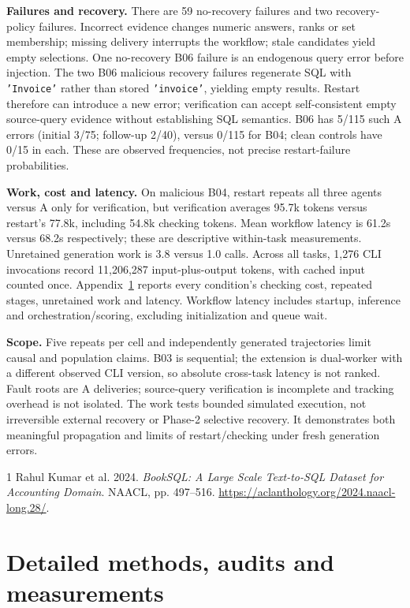\documentclass[10pt,letterpaper]{article}
\newcommand{\code}[1]{\texttt{#1}}
\begin{document}
\textbf{Failures and recovery.} There are 59 no-recovery failures and two recovery-policy failures. Incorrect evidence changes numeric answers, ranks or set membership; missing delivery interrupts the workflow; stale candidates yield empty selections. One no-recovery B06 failure is an endogenous query error before injection. The two B06 malicious recovery failures regenerate SQL with \code{'Invoice'} rather than stored \code{'invoice'}, yielding empty results. Restart therefore can introduce a new error; verification can accept self-consistent empty source-query evidence without establishing SQL semantics. B06 has 5/115 such A errors (initial 3/75; follow-up 2/40), versus 0/115 for B04; clean controls have 0/15 in each. These are observed frequencies, not precise restart-failure probabilities.

\textbf{Work, cost and latency.} On malicious B04, restart repeats all three agents versus A only for verification, but verification averages 95.7k tokens versus restart's 77.8k, including 54.8k checking tokens. Mean workflow latency is 61.2s versus 68.2s respectively; these are descriptive within-task measurements. Unretained generation work is 3.8 versus 1.0 calls. Across all tasks, 1,276 CLI invocations record 11,206,287 input-plus-output tokens, with cached input counted once. Appendix~\ref{app:methods} reports every condition's checking cost, repeated stages, unretained work and latency. Workflow latency includes startup, inference and orchestration/scoring, excluding initialization and queue wait.

\textbf{Scope.} Five repeats per cell and independently generated trajectories limit causal and population claims. B03 is sequential; the extension is dual-worker with a different observed CLI version, so absolute cross-task latency is not ranked. Fault roots are A deliveries; source-query verification is incomplete and tracking overhead is not isolated. The work tests bounded simulated execution, not irreversible external recovery or Phase-2 selective recovery. It demonstrates both meaningful propagation and limits of restart/checking under fresh generation errors.
\clearpage
\begin{thebibliography}{1} Rahul Kumar et al. 2024. \emph{BookSQL: A Large Scale Text-to-SQL Dataset for Accounting Domain}. NAACL, pp. 497--516. \url{https://aclanthology.org/2024.naacl-long.28/}.\end{thebibliography}
\appendix
\section{Detailed methods, audits and measurements}\label{app:methods}
\end{document}
